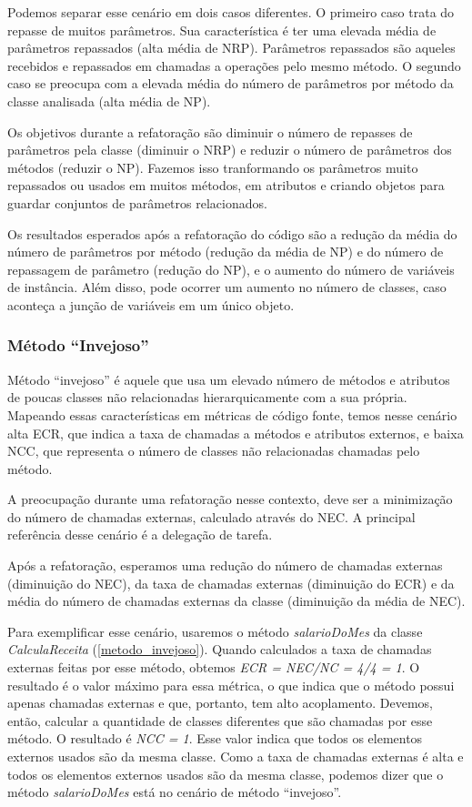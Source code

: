 	Podemos separar esse cenário em dois casos diferentes. O primeiro caso trata do repasse de muitos parâmetros. Sua característica é ter uma elevada média de parâmetros repassados (alta média de NRP). Parâmetros repassados são aqueles recebidos e repassados em chamadas a operações pelo mesmo método. O segundo caso se preocupa com a elevada média do número de parâmetros por método da classe analisada (alta média de NP).
	
	Os objetivos durante a refatoração são diminuir o número de repasses de parâmetros pela classe (diminuir o NRP) e reduzir o número de parâmetros dos métodos (reduzir o NP). Fazemos isso tranformando os parâmetros muito repassados ou usados em muitos métodos, em atributos e criando objetos para guardar conjuntos de parâmetros relacionados.
	
	Os resultados esperados após a refatoração do código são a redução da média do número de parâmetros por método (redução da média de NP) e do número de repassagem de parâmetro (redução do NP), e o aumento do número de variáveis de instância. Além disso, pode ocorrer um aumento no número de classes, caso aconteça a junção de variáveis em um único objeto.	
	


\subsubsection{Método ``Invejoso''}
	
	Método ``invejoso'' é aquele que usa um elevado número de métodos e atributos de poucas classes não relacionadas hierarquicamente com a sua própria. Mapeando essas características em métricas de código fonte, temos nesse cenário alta ECR, que indica a taxa de chamadas a métodos e atributos externos, e baixa NCC, que representa o número de classes não relacionadas chamadas pelo método.
	
	A preocupação durante uma refatoração nesse contexto, deve ser a minimização do número de chamadas externas, calculado através do NEC. A principal referência desse cenário é a delegação de tarefa.
	
	Após a refatoração, esperamos uma redução do número de chamadas externas (diminuição do NEC), da taxa de chamadas externas (diminuição do ECR) e da média do número de chamadas externas da classe (diminuição da média de NEC).
                      
	Para exemplificar esse cenário, usaremos o método \textit{salarioDoMes} da classe \textit{CalculaReceita} (\ref{metodo_invejoso}). Quando calculados a taxa de chamadas externas feitas por esse método, obtemos \textit{ECR = NEC/NC = 4/4 = 1}. O resultado é o valor máximo para essa métrica, o que indica que o método possui apenas chamadas externas e que, portanto, tem alto acoplamento. Devemos, então, calcular a quantidade de classes diferentes que são chamadas por esse método. O resultado é \textit{NCC = 1}. Esse valor indica que todos os elementos externos usados são da mesma classe. Como a taxa de chamadas externas é alta e todos os elementos externos usados são da mesma classe, podemos dizer que o método \textit{salarioDoMes} está no cenário de método ``invejoso''.

